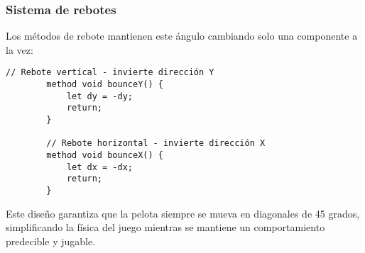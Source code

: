 \documentclass{report}
\begin{document}
	\subsubsection{Sistema de rebotes}
	Los métodos de rebote mantienen este ángulo cambiando solo una componente a la vez:
	
	\begin{lstlisting}[caption=Métodos de rebote]
		// Rebote vertical - invierte dirección Y
		method void bounceY() {
			let dy = -dy;
			return;
		}
		
		// Rebote horizontal - invierte dirección X  
		method void bounceX() {
			let dx = -dx;
			return;
		}
	\end{lstlisting}
	
	Este diseño garantiza que la pelota siempre se mueva en diagonales de 45 grados, simplificando la física del juego mientras se mantiene un comportamiento predecible y jugable.
	
\end{document}
